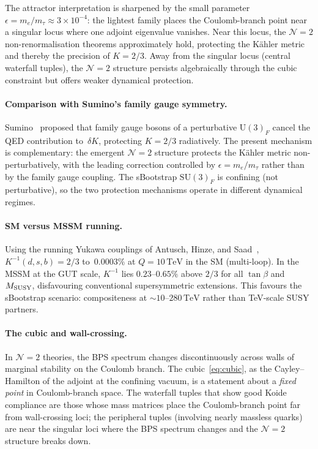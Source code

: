 \documentclass[aps,prd,twocolumn,showpacs,preprintnumbers,superscriptaddress,floatfix]{revtex4-2}
\newcommand{\SU}{\mathrm{SU}}
\newcommand{\UU}{\mathrm{U}}
\newcommand{\TeV}{\,\mathrm{TeV}}
\begin{document}
The attractor interpretation is sharpened by the small parameter
$\epsilon = m_e/m_\tau \approx 3 \times 10^{-4}$:
the lightest family places the Coulomb-branch point near a
singular locus where one adjoint eigenvalue vanishes.
Near this locus, the $\mathcal{N}{=}2$ non-renormalisation
theorems approximately hold, protecting the K\"ahler metric and
thereby the precision of $K = 2/3$.
Away from the singular locus (central waterfall tuples), the
$\mathcal{N}{=}2$ structure persists algebraically through the
cubic constraint but offers weaker dynamical protection.

\paragraph{Comparison with Sumino's family gauge symmetry.}
Sumino~\cite{Sumino:2009} proposed that family gauge bosons of a
perturbative $\UU(3)_F$ cancel the QED contribution to~$\delta K$,
protecting $K = 2/3$ radiatively.
The present mechanism is complementary: the emergent $\mathcal{N}{=}2$
structure protects the K\"ahler metric non-perturbatively, with the
leading correction controlled by $\epsilon = m_e/m_\tau$ rather than
by the family gauge coupling.
The sBootstrap $\SU(3)_F$ is confining (not perturbative), so the
two protection mechanisms operate in different dynamical regimes.

\paragraph{SM versus MSSM running.}
Using the running Yukawa couplings of Antusch, Hinze, and
Saad~\cite{Antusch:2025ahs}, $K^{-1}(d,s,b) = 2/3$ to~$0.0003\%$
at $Q = 10\TeV$ in the SM (multi-loop).
In the MSSM at the GUT scale, $K^{-1}$ lies $0.23$--$0.65\%$ above
$2/3$ for all $\tan\beta$ and $M_{\rm SUSY}$, disfavouring
conventional supersymmetric extensions.
This favours the sBootstrap scenario: compositeness at
$\sim\!10$--$280\TeV$ rather than TeV-scale SUSY partners.

\paragraph{The cubic and wall-crossing.}
In $\mathcal{N}{=}2$ theories, the BPS spectrum changes
discontinuously across walls of marginal stability on the Coulomb
branch.
The cubic~\eqref{eq:cubic}, as the Cayley--Hamilton of the
adjoint at the confining vacuum, is a statement about a
\emph{fixed point} in Coulomb-branch space.
The waterfall tuples that show good Koide compliance are those
whose mass matrices place the Coulomb-branch point far from
wall-crossing loci; the peripheral tuples (involving nearly
massless quarks) are near the singular loci where the BPS spectrum
changes and the $\mathcal{N}{=}2$ structure breaks down.
\end{document}
